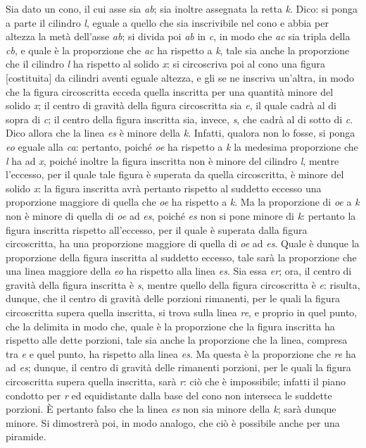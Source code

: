 \documentclass[11pt,twoside,openany]{book}
\begin{document}
Sia dato un cono, il cui asse sia \emph{ab}; sia inoltre assegnata la retta \emph{k}. Dico: si ponga a parte il cilindro \emph{l}, eguale a quello che sia inscrivibile nel cono e abbia per altezza la metà dell'asse \emph{ab}; si divida poi \emph{ab} in \emph{c}, in modo che \emph{ac} sia tripla della \emph{cb}, e quale è la proporzione che \emph{ac} ha rispetto a \emph{k}, tale sia anche la proporzione che il cilindro \emph{l} ha rispetto al solido \emph{x}: si circoscriva poi al cono una figura [costituita] da cilindri aventi eguale altezza, e gli se ne inscriva un'altra, in modo che la figura circoscritta ecceda quella inscritta per una quantità minore del solido \emph{x}; il centro di gravità della figura circoscritta sia \emph{e}, il quale cadrà al di sopra di \emph{c}; il centro della figura inscritta sia, invece, \emph{s}, che cadrà al di sotto di \emph{c}. Dico allora che la linea \emph{es} è minore della \emph{k}. Infatti, qualora non lo fosse, si ponga \emph{eo} eguale alla \emph{ca}: pertanto, poiché \emph{oe} ha rispetto a \emph{k} la medesima proporzione che \emph{l} ha ad \emph{x}, poiché inoltre la figura inscritta non è minore del cilindro \emph{l}, mentre l'eccesso, per il quale tale figura è superata da quella circoscritta, è minore del solido \emph{x}: la figura inscritta avrà pertanto rispetto al suddetto eccesso una proporzione maggiore di quella che \emph{oe} ha rispetto a \emph{k}. Ma la proporzione di \emph{oe} a \emph{k} non è minore di quella di \emph{oe} ad \emph{es}, poiché \emph{es} non si pone minore di \emph{k}: pertanto la figura inscritta rispetto all'eccesso, per il quale è superata dalla figura circoscritta, ha una proporzione maggiore di quella di \emph{oe} ad \emph{es}. Quale è dunque la proporzione della figura inscritta al suddetto eccesso, tale sarà la proporzione che una linea maggiore della \emph{eo} ha rispetto alla linea \emph{es}. Sia essa \emph{er}; ora, il centro di gravità della figura inscritta è \emph{s}, mentre quello della figura circoscritta è \emph{e}: risulta, dunque, che il centro di gravità delle porzioni rimanenti, per le quali la figura circoscritta supera quella inscritta, si trova sulla linea \emph{re}, e proprio in quel punto, che la delimita in modo che, quale è la proporzione che la figura inscritta ha rispetto alle dette porzioni, tale sia anche la proporzione che la linea, compresa tra \emph{e} e quel punto, ha rispetto alla linea \emph{es}. Ma questa è la proporzione che \emph{re} ha ad \emph{es}; dunque, il centro di gravità delle rimanenti porzioni, per le quali la figura circoscritta supera quella inscritta, sarà \emph{r}: ciò che è impossibile; infatti il piano condotto per \emph{r} ed equidistante dalla base del cono non interseca le suddette porzioni. È pertanto falso che la linea \emph{es} non sia minore della \emph{k}; sarà dunque minore. Si dimostrerà poi, in modo analogo, che ciò è possibile anche per una piramide.
\end{document}
